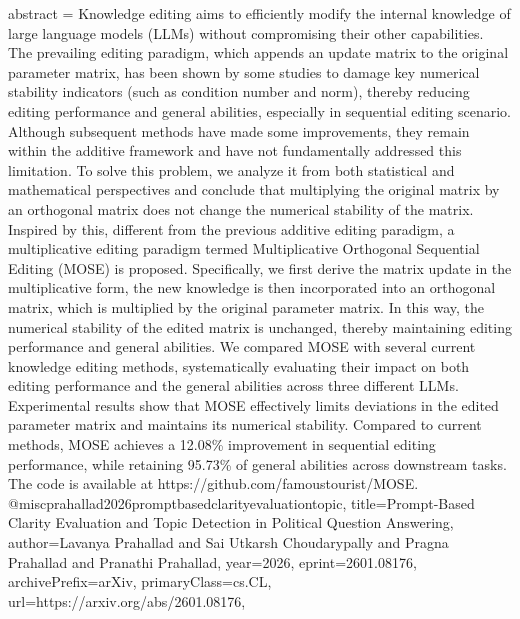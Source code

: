 {      abstract = {Knowledge editing aims to efficiently modify the internal knowledge of large language models (LLMs) without compromising their other capabilities. The prevailing editing paradigm, which appends an update matrix to the original parameter matrix, has been shown by some studies to damage key numerical stability indicators (such as condition number and norm), thereby reducing editing performance and general abilities, especially in sequential editing scenario. Although subsequent methods have made some improvements, they remain within the additive framework and have not fundamentally addressed this limitation. To solve this problem, we analyze it from both statistical and mathematical perspectives and conclude that multiplying the original matrix by an orthogonal matrix does not change the numerical stability of the matrix. Inspired by this, different from the previous additive editing paradigm, a multiplicative editing paradigm termed Multiplicative Orthogonal Sequential Editing (MOSE) is proposed. Specifically, we first derive the matrix update in the multiplicative form, the new knowledge is then incorporated into an orthogonal matrix, which is multiplied by the original parameter matrix. In this way, the numerical stability of the edited matrix is unchanged, thereby maintaining editing performance and general abilities. We compared MOSE with several current knowledge editing methods, systematically evaluating their impact on both editing performance and the general abilities across three different LLMs. Experimental results show that MOSE effectively limits deviations in the edited parameter matrix and maintains its numerical stability. Compared to current methods, MOSE achieves a 12.08\% improvement in sequential editing performance, while retaining 95.73\% of general abilities across downstream tasks. The code is available at https://github.com/famoustourist/MOSE.}
}@misc{prahallad2026promptbasedclarityevaluationtopic,
      title={Prompt-Based Clarity Evaluation and Topic Detection in Political Question Answering}, 
      author={Lavanya Prahallad and Sai Utkarsh Choudarypally and Pragna Prahallad and Pranathi Prahallad},
      year={2026},
      eprint={2601.08176},
      archivePrefix={arXiv},
      primaryClass={cs.CL},
      url={https://arxiv.org/abs/2601.08176},
}

